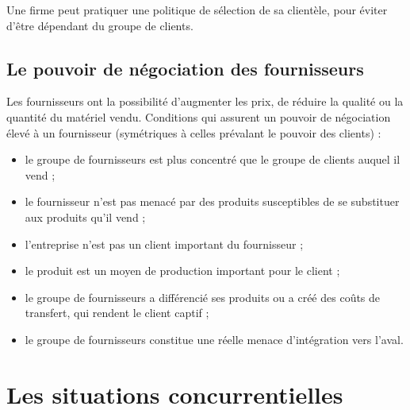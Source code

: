 		 Une firme peut pratiquer une politique de sélection de sa clientèle, pour éviter d'être dépendant du groupe de clients.
		 
		 \subsection{Le pouvoir de négociation des fournisseurs}
		 
		 Les fournisseurs ont la possibilité d'augmenter les prix, de réduire la qualité ou la quantité du matériel vendu. Conditions qui assurent un pouvoir de négociation élevé à un fournisseur (symétriques à celles prévalant le pouvoir des clients) :
		 
		 \begin{itemize}
		 	\item le groupe de fournisseurs est plus concentré que le groupe de clients auquel il vend ;
		 	\item le fournisseur n'est pas menacé par des produits susceptibles de se substituer aux produits qu'il vend ;
		 	\item l'entreprise n'est pas un client important du fournisseur ;
		 	\item le produit est un moyen de production important pour le client ;
		 	\item le groupe de fournisseurs a différencié ses produits ou a créé des coûts de transfert, qui rendent le client captif ;
		 	\item le groupe de fournisseurs constitue une réelle menace d'intégration vers l'aval.
		 \end{itemize}
		 
	\section{Les situations concurrentielles}
	
		
